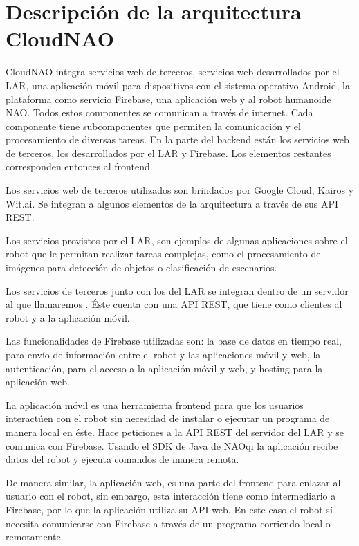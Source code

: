 \section{Descripción de la arquitectura CloudNAO}
\label{\detokenize{chapter_two/desc_cloudnao:descripcion-de-la-arquitectura-cloudnao}}\label{\detokenize{chapter_two/desc_cloudnao::doc}}
CloudNAO integra servicios web de
terceros, servicios web desarrollados por el LAR, una aplicación móvil para
dispositivos con el sistema operativo Android, la plataforma como servicio
Firebase, una aplicación web y al robot humanoide NAO. Todos estos componentes
se comunican a través de internet. Cada componente tiene subcomponentes que
permiten la comunicación y el procesamiento de diversas tareas. En la parte del
backend están los servicios web de terceros, los desarrollados
por el LAR y Firebase. Los elementos restantes corresponden entonces al
frontend.

Los servicios web de terceros utilizados son brindados por Google Cloud,
Kairos y Wit.ai. Se integran a algunos elementos de la arquitectura a través
de sus API REST.

Los servicios provistos por el LAR, son ejemplos de algunas aplicaciones sobre el
robot que le permitan realizar tareas complejas, como el procesamiento
de imágenes para detección de objetos o clasificación de escenarios.

Los servicios de terceros junto con los del LAR se integran dentro de un servidor al
que llamaremos . Éste cuenta
con una API REST, que tiene como clientes al robot y a la aplicación móvil.

Las funcionalidades de Firebase utilizadas son: la base de datos en tiempo real,
para envío de información entre el robot y las aplicaciones móvil y web,
la autenticación, para el acceso a la aplicación móvil y web, y hosting para
la aplicación web.

La aplicación móvil es una herramienta frontend para que los usuarios
interactúen con el robot sin necesidad de instalar o ejecutar un programa de
manera local en éste. Hace peticiones a la API REST del servidor del LAR y
se comunica con Firebase. Usando el SDK de Java de NAOqi la
aplicación recibe datos del robot y ejecuta comandos de manera remota.

De manera similar, la aplicación web, es una parte del frontend para enlazar
al usuario con el robot, sin embargo, esta interacción tiene como intermediario
a Firebase, por lo que la aplicación utiliza su API web. En este caso el robot
sí necesita comunicarse con Firebase a través de un programa corriendo local
o remotamente.


